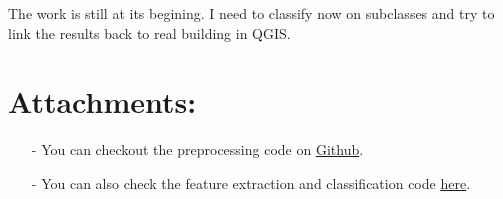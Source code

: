 \documentclass[a4paper, 11pt]{article}
\begin{document}
	The work is still at its begining. I need to classify now on subclasses and try to link the results back to real building in QGIS.

	\section*{Attachments:}
	\begin{itemize}
		\item[-] You can checkout the preprocessing code on
		\href{https://github.com/ethiy/proj.city}{Github}.
		\item[-] You can also check the feature extraction and classification code
		\href{https://github.com/ethiy/qualcity}{here}.
	\end{itemize}
\end{document}
